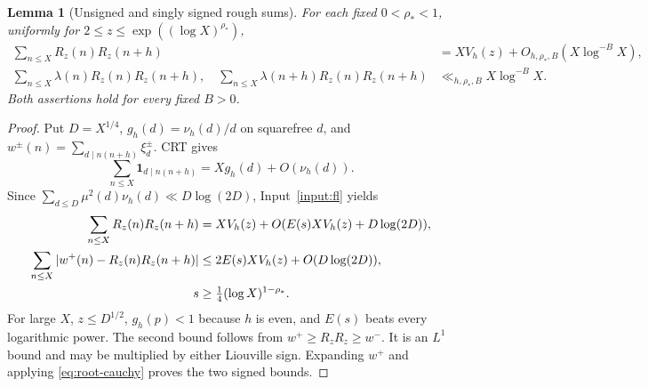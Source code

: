 \documentclass[11pt]{article}
\newtheorem{lemma}[theorem]{Lemma}
\theoremstyle{definition}
\newcommand{\ind}{\mathbf 1}
\theoremstyle{remark}
\numberwithin{equation}{section}
\begin{document}
\begin{lemma}[Unsigned and singly signed rough sums]\label{lem:rough-sieve}
For each fixed $0<\rho_*<1$, uniformly for $2\le z\le\exp((\log X)^{\rho_*})$,
\begin{align}
 \sum_{n\le X}R_z(n)R_z(n+h)&=XV_h(z)+O_{h,\rho_*,B}(X\log^{-B}X),\label{eq:rough-unsigned}\\
 \sum_{n\le X}\lambda(n)R_z(n)R_z(n+h),\quad
 \sum_{n\le X}\lambda(n+h)R_z(n)R_z(n+h)&\ll_{h,\rho_*,B}X\log^{-B}X.\label{eq:rough-single}
\end{align}
Both assertions hold for every fixed $B>0$.
\end{lemma}
\begin{proof}
Put $D=X^{1/4}$, $g_h(d)=\nu_h(d)/d$ on squarefree $d$, and
$w^\pm(n)=\sum_{d\mid n(n+h)}\xi_d^\pm$. CRT gives
\begin{equation}\label{eq:sieve-crt}
 \sum_{n\le X}\ind_{d\mid n(n+h)}=Xg_h(d)+O(\nu_h(d)).
\end{equation}
Since $\sum_{d\le D}\mu^2(d)\nu_h(d)\ll D\log(2D)$, Input~\ref{input:fl} yields
\begin{align}
 \sum_{n\le X}R_z(n)R_z(n+h)&=XV_h(z)+O(E(s)XV_h(z)+D\log(2D)),\label{eq:sieve-count}\\
 \sum_{n\le X}|w^+(n)-R_z(n)R_z(n+h)|&\le2E(s)XV_h(z)+O(D\log(2D)),\label{eq:sieve-lone}\\
 \qquad s&\ge\tfrac14(\log X)^{1-\rho_*}.\notag
\end{align}
For large $X$, $z\le D^{1/2}$, $g_h(p)<1$ because $h$ is even, and $E(s)$ beats every logarithmic power.
The second bound follows from $w^+\ge R_zR_z\ge w^-$. It is an $L^1$ bound and may be multiplied by either
Liouville sign. Expanding $w^+$ and applying \eqref{eq:root-cauchy} proves the two signed bounds.
\end{proof}
\end{document}
